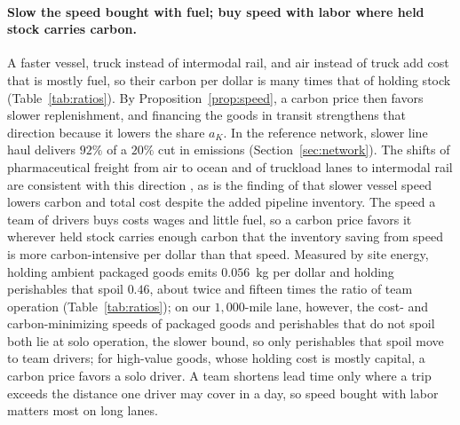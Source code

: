 \documentclass[11pt]{article}
\numberwithin{proposition}{section}
\theoremstyle{definition}
\theoremstyle{remark}
\theoremstyle{plain}
\begin{document}
\paragraph{Slow the speed bought with fuel; buy speed with labor where held stock carries carbon.} A faster
vessel, truck instead of intermodal rail, and air instead of truck add cost that is mostly fuel, so their carbon per
dollar is many times that of holding stock (Table~\ref{tab:ratios}). By Proposition~\ref{prop:speed}, a carbon
price then favors slower replenishment, and financing the goods in transit strengthens that direction because it
lowers the share $a_K$. In the reference network, slower line haul delivers $92\%$ of a $20\%$ cut in emissions
(Section~\ref{sec:network}). The shifts of pharmaceutical freight from air to ocean and of truckload lanes to
intermodal rail are consistent with this direction \citep{pharmcommerce2023astrazeneca, freightwaves2026intermodal},
as is the finding of \citet{maloni2013slow} that slower vessel speed lowers carbon and total cost despite the
added pipeline inventory. The speed a team of drivers buys costs wages and little fuel, so a carbon price favors it
wherever held stock carries enough carbon that the inventory saving from speed is more carbon-intensive per dollar
than that speed. Measured by site energy, holding ambient packaged goods emits $0.056$~kg per dollar and holding
perishables that spoil $0.46$, about twice and fifteen times the ratio of team operation (Table~\ref{tab:ratios});
on our $1{,}000$-mile lane, however, the cost- and carbon-minimizing speeds of packaged goods and perishables
that do not spoil both lie at solo operation, the slower bound, so only perishables that spoil move to team drivers;
for high-value goods, whose holding cost is mostly capital, a carbon price favors a solo driver. A team shortens lead time only where a trip exceeds the distance one driver may cover in a day, so speed
bought with labor matters most on long lanes.
\end{document}
